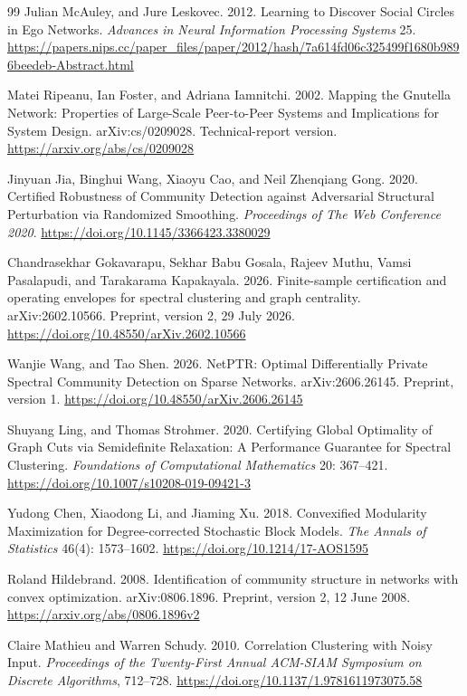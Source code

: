 \documentclass[sigconf,anonymous,review]{acmart}
\newcommand{\1}{\mathbf{1}}
\begin{document}
\begin{thebibliography}{99}
Julian McAuley, and Jure Leskovec. 2012. Learning to Discover Social Circles in Ego Networks. \emph{Advances in Neural Information Processing Systems} 25. \url{https://papers.nips.cc/paper_files/paper/2012/hash/7a614fd06c325499f1680b9896beedeb-Abstract.html}

Matei Ripeanu, Ian Foster, and Adriana Iamnitchi. 2002. Mapping the {Gnutella} Network: Properties of Large-Scale Peer-to-Peer Systems and Implications for System Design. arXiv:cs/0209028. Technical-report version. \url{https://arxiv.org/abs/cs/0209028}

Jinyuan Jia, Binghui Wang, Xiaoyu Cao, and Neil Zhenqiang Gong. 2020. Certified Robustness of Community Detection against Adversarial Structural Perturbation via Randomized Smoothing. \emph{Proceedings of The Web Conference 2020}. \url{https://doi.org/10.1145/3366423.3380029}

Chandrasekhar Gokavarapu, Sekhar Babu Gosala, Rajeev Muthu, Vamsi Pasalapudi, and Tarakarama Kapakayala. 2026. Finite-sample certification and operating envelopes for spectral clustering and graph centrality. arXiv:2602.10566. Preprint, version 2, 29 July 2026. \url{https://doi.org/10.48550/arXiv.2602.10566}

Wanjie Wang, and Tao Shen. 2026. {NetPTR}: Optimal Differentially Private Spectral Community Detection on Sparse Networks. arXiv:2606.26145. Preprint, version 1. \url{https://doi.org/10.48550/arXiv.2606.26145}

Shuyang Ling, and Thomas Strohmer. 2020. Certifying Global Optimality of Graph Cuts via Semidefinite Relaxation: A Performance Guarantee for Spectral Clustering. \emph{Foundations of Computational Mathematics} 20: 367--421. \url{https://doi.org/10.1007/s10208-019-09421-3}

Yudong Chen, Xiaodong Li, and Jiaming Xu. 2018. Convexified Modularity Maximization for Degree-corrected Stochastic Block Models. \emph{The Annals of Statistics} 46(4): 1573--1602. \url{https://doi.org/10.1214/17-AOS1595}

Roland Hildebrand. 2008. Identification of community structure in networks with convex optimization. arXiv:0806.1896. Preprint, version 2, 12 June 2008. \url{https://arxiv.org/abs/0806.1896v2}

Claire Mathieu and Warren Schudy. 2010. Correlation Clustering with Noisy Input. \emph{Proceedings of the Twenty-First Annual ACM-SIAM Symposium on Discrete Algorithms}, 712--728. \url{https://doi.org/10.1137/1.9781611973075.58}


\end{thebibliography}
\end{document}
